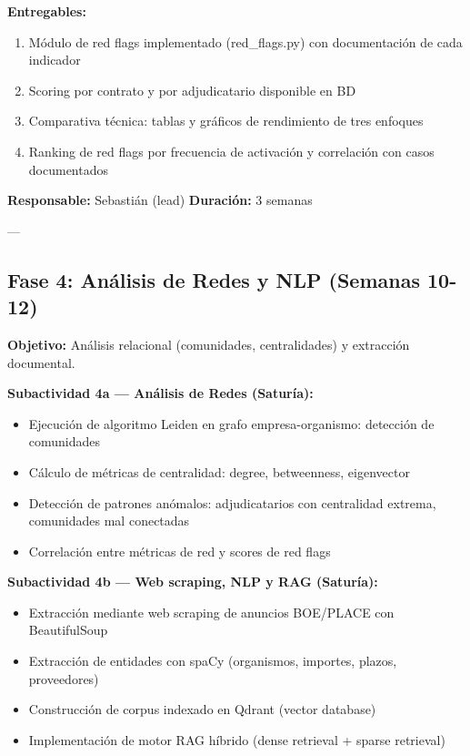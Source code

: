 \documentclass[11pt,a4paper,spanish]{book}
\numberwithin{equation}{chapter}
\numberwithin{figure}{chapter}
\begin{document}
\textbf{Entregables:}
\begin{enumerate}
\item Módulo de red flags implementado (red\_flags.py) con documentación de cada indicador
\item Scoring por contrato y por adjudicatario disponible en BD
\item Comparativa técnica: tablas y gráficos de rendimiento de tres enfoques
\item Ranking de red flags por frecuencia de activación y correlación con casos documentados
\end{enumerate}

\textbf{Responsable:} Sebastián (lead)
\textbf{Duración:} 3 semanas

---

\subsection{Fase 4: Análisis de Redes y NLP (Semanas 10-12)}

\textbf{Objetivo:} Análisis relacional (comunidades, centralidades) y extracción documental.

\textbf{Subactividad 4a — Análisis de Redes (Saturía):}

\begin{itemize}
\item Ejecución de algoritmo Leiden en grafo empresa-organismo: detección de comunidades
\item Cálculo de métricas de centralidad: degree, betweenness, eigenvector
\item Detección de patrones anómalos: adjudicatarios con centralidad extrema, comunidades mal conectadas
\item Correlación entre métricas de red y scores de red flags
\end{itemize}

\textbf{Subactividad 4b — Web scraping, NLP y RAG (Saturía):}

\begin{itemize}
\item Extracción mediante web scraping de anuncios BOE/PLACE con BeautifulSoup
\item Extracción de entidades con spaCy (organismos, importes, plazos, proveedores)
\item Construcción de corpus indexado en Qdrant (vector database)
\item Implementación de motor RAG híbrido (dense retrieval + sparse retrieval)
\end{itemize}
\end{document}

